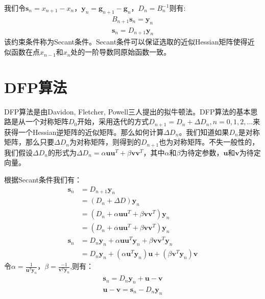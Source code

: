 
我们令$\mathbf{s}_n=x_{n+1}-x_{n}$，$\mathbf{y}_n=\mathbf{g}_{n+1} - \mathbf{g}_n$，$D_n = B_n^{-1}$则有:
\begin{displaymath}
\begin{split}
B_{n+1}\mathbf{s}_n = \mathbf{y}_n\\
\mathbf{s}_n = D_{n+1} \mathbf{y}_n
\end{split}
\end{displaymath}
该约束条件称为Secant条件。Secant条件可以保证选取的近似Hessian矩阵使得近似函数在点$x_{n-1}$和$x_n$处的一阶导数同原始函数一致。


\section{DFP算法}
DFP算法是由Davidon, Fletcher, Powell三人提出的拟牛顿法。DFP算法的基本思路是从一个对称矩阵$D_0$开始，采用迭代的方式$D_{n+1}=D_n+\Delta D_n, n=0,1,2,...$来获得一个Hessian逆矩阵的近似矩阵。那么如何计算$\Delta D_n$。我们知道如果$D_n$是对称矩阵，那么只要$\Delta D_n$为对称矩阵，则得到的$D_{n+1}$也为对称矩阵。不失一般性的，我们假设$\Delta D_n$的形式为$\Delta D_n = \alpha\mathbf{uu}^T + \beta \mathbf{vv}^T$，其中$\alpha$和$\beta$为待定参数，$\mathbf{u}$和$\mathbf{v}$为待定向量。

根据Secant条件我们有：
\begin{displaymath}
\begin{split}
\mathbf{s}_n &= D_{n+1} \mathbf{y}_n\\
 &= (D_n + \Delta D) \mathbf{y}_n\\
 &= (D_n + \alpha\mathbf{uu}^T + \beta \mathbf{vv}^T) \mathbf{y}_n\\
 &= (D_n + \alpha\mathbf{uu}^T + \beta \mathbf{vv}^T) \mathbf{y}_n\\
\mathbf{s}_n &= D_n \mathbf{y}_n + \alpha\mathbf{uu}^T \mathbf{y}_n + \beta \mathbf{vv}^T \mathbf{y}_n\\
&= D_n \mathbf{y}_n + (\alpha\mathbf{u}^T \mathbf{y}_n)\mathbf{u} + (\beta \mathbf{v}^T \mathbf{y}_n)\mathbf{v}
\end{split}
\end{displaymath}
令$\alpha=\frac{1}{\mathbf{u}^T \mathbf{y}_n}$，$\beta = \frac{-1}{\mathbf{v}^T \mathbf{y}_n}$,则有：
\begin{displaymath}
\begin{split}
\mathbf{s}_n = D_n \mathbf{y}_n + \mathbf{u} -  \mathbf{v}\\
\mathbf{u} -  \mathbf{v} =\mathbf{s}_n - D_n \mathbf{y}_n 
\end{split}
\end{displaymath}

